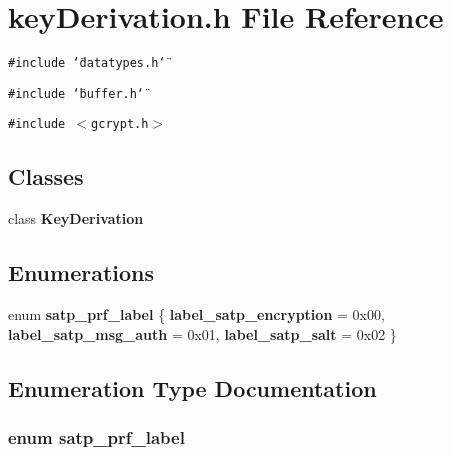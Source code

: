 \section{key\-Derivation.h File Reference}
\label{keyDerivation_8h}
{\tt \#include \char`\"{}datatypes.h\char`\"{}}\par
{\tt \#include \char`\"{}buffer.h\char`\"{}}\par
{\tt \#include $<$gcrypt.h$>$}\par
\subsection*{Classes}
\begin{CompactItemize}
\item 
class {\bf Key\-Derivation}
\end{CompactItemize}
\subsection*{Enumerations}
\begin{CompactItemize}
\item 
enum {\bf satp\_\-prf\_\-label} \{ {\bf label\_\-satp\_\-encryption} =  0x00, 
{\bf label\_\-satp\_\-msg\_\-auth} =  0x01, 
{\bf label\_\-satp\_\-salt} =  0x02
 \}
\end{CompactItemize}


\subsection{Enumeration Type Documentation}
\subsubsection{\setlength{\rightskip}{0pt plus 5cm}enum {\bf satp\_\-prf\_\-label}}\label{keyDerivation_8h_4829fcd87054af9b3ced79bbac1ce1eb}


